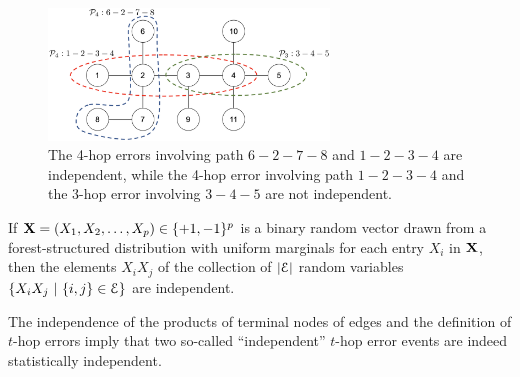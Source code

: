 \begin{figure}[t]
	\centering
	\includegraphics[width=0.665\textwidth]{indep_err.eps}
	\caption{\small The 4-hop errors involving path $6-2-7-8$ and $1-2-3-4$ are independent, while the 4-hop error involving path $1-2-3-4$ and the 3-hop error involving $3-4-5$ are not independent.}
	\label{fig:indeperr}
\end{figure}
\begin{lemma}\label{lem:indeppair}
	If $\mathbf{X}=(X_1, X_2, \ldots, X_p) \in \{+1,-1\}^{p}$ is a  binary random vector    drawn from a forest-structured distribution with uniform marginals for each entry $X_{i}$ in $\mathbf{X}$, then the elements  $X_iX_j$
	of the collection of $|\mathcal{E}|$ random variables $\{X_{i}X_{j}~|~\{i,j\}\in\mathcal{E}\}$ are independent.
\end{lemma}
The independence of the products of terminal nodes of edges and the definition of $t$-hop errors imply that two so-called ``independent'' $t$-hop error events are indeed statistically independent. 

